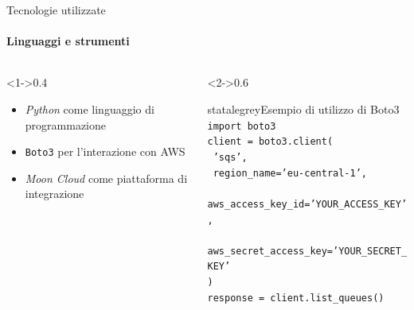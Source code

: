 \documentclass{beamer}
\begin{document}
\begin{frame}{Tecnologie utilizzate}
    \framesubtitle{Linguaggi e strumenti}
    \begin{columns}
        \begin{column}<1->{0.4\textwidth}
            \begin{itemize}
                \item \emph{Python} come linguaggio di programmazione
                \item \texttt{Boto3} per l'interazione con AWS
                \item \emph{Moon Cloud} come piattaforma di integrazione
            \end{itemize}
        \end{column}
        \begin{column}<2->{0.6\textwidth}
            \begin{colorblock}[black]{statalegrey}{Esempio di utilizzo di Boto3}
                \texttt{\textcolor{maincolor}{import} boto3}\\
                \texttt{client = boto3.\textcolor{maincolor}{client}(}\\
                \texttt{    \textcolor{statalegreen}{'sqs'},}\\
                \texttt{    region\_name=\textcolor{statalegreen}{'eu-central-1'},}\\
                \texttt{    aws\_access\_key\_id=\textcolor{statalegreen}{'YOUR\_ACCESS\_KEY'},}\\
                \texttt{    aws\_secret\_access\_key=\textcolor{statalegreen}{'YOUR\_SECRET\_KEY'}}\\
                \texttt{)}\\
                \texttt{response = client.\textcolor{maincolor}{list\_queues}()}\\
            \end{colorblock}
        \end{column}
    \end{columns}
\end{frame}
\end{document}
